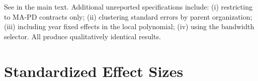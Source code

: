 \documentclass[12pt]{article}
\begin{document}
See  in the main text. Additional unreported specifications include: (i) restricting to MA-PD contracts only; (ii) clustering standard errors by parent organization; (iii) including year fixed effects in the local polynomial; (iv) using the \citet{imbens2012} bandwidth selector. All produce qualitatively identical results.

\section{Standardized Effect Sizes}
\label{sec:sde}


\end{document}
